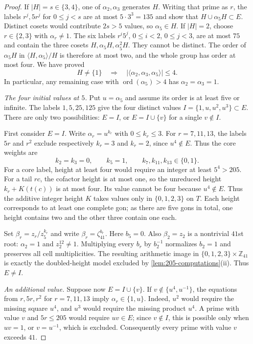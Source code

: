 \documentclass[11pt,reqno]{amsart}
\newcommand{\Z}{\mathbb Z}
\theoremstyle{definition}
\theoremstyle{remark}
\numberwithin{equation}{section}
\begin{document}
\begin{proof}
If $|H|=s\in\{3,4\}$, one of $\alpha_2,\alpha_3$ generates $H$.
Writing that prime as $r$, the labels $r^j,5r^j$ for $0\le j<s$
are at most $5\cdot3^3=135$ and show that
$H\cup\alpha_5H\subset E$. Distinct cosets would contribute
$2s>5$ values, so $\alpha_5\in H$.
If $|H|=2$, choose $r\in\{2,3\}$ with $\alpha_r\ne1$.
The six labels $r^i5^j$, $0\le i<2$, $0\le j<3$, are at most
$75$ and contain the three cosets $H,\alpha_5H,\alpha_5^2H$.
They cannot be distinct. The order of $\alpha_5H$ in
$\langle H,\alpha_5\rangle/H$ is therefore at most two, and the
whole group has order at most four. We have proved
\begin{equation}\label{eq:205-small-phase-subgroup}
 H\ne\{1\}\quad\Longrightarrow\quad
 |\langle\alpha_2,\alpha_3,\alpha_5\rangle|\le4.
\end{equation}
In particular, any remaining case with
$\operatorname{ord}(\alpha_5)>4$ has $\alpha_2=\alpha_3=1$.

\smallskip\noindent
\emph{The four initial values at $5$.}
Put $u=\alpha_5$ and assume its order is at least five or infinite.
The labels $1,5,25,125$ give the four distinct values
$I=\{1,u,u^2,u^3\}\subset E$. There are only two possibilities:
$E=I$, or $E=I\cup\{v\}$ for a single $v\notin I$.

First consider $E=I$. Write $\alpha_r=u^{k_r}$ with
$0\le k_r\le3$. For $r=7,11,13$, the labels $5r$ and $r^2$
exclude respectively $k_r=3$ and $k_r=2$, since $u^4\notin E$.
Thus the core weights are
\[
 k_2=k_3=0,\qquad k_5=1,\qquad
 k_7,k_{11},k_{13}\in\{0,1\}.
\]
For a core label, height at least four would require an integer at
least $5^4>205$. For a tail $rc$, the cofactor height is at most one,
so the unreduced height $k_r+K(t(c))$ is at most four. Its value
cannot be four because $u^4\notin E$. Thus the additive integer height
$K$ takes values only in $\{0,1,2,3\}$ on $T$. Each height corresponds
to at least one complete gon; as there are five gons in total, one height contains two
and the other three contain one each.

Set $\beta_r=z_r/z_5^{k_r}$ and write
$\beta_r=\zeta_{41}^{b_r}$. Here $b_5=0$. Also $\beta_2=z_2$ is a
nontrivial $41$st root: $\alpha_2=1$ and $z_2^{12}\ne1$.
Multiplying every $b_r$ by $b_2^{-1}$ normalizes $b_2=1$ and preserves
all cell multiplicities. The resulting arithmetic image in
$\{0,1,2,3\}\times\Z_{41}$ is exactly the doubled-height model
excluded by \cref{lem:205-computations}(ii). Thus $E\ne I$.

\smallskip\noindent
\emph{An additional value.}
Suppose now $E=I\cup\{v\}$. If
$v\notin\{u^4,u^{-1}\}$, the equations from $r,5r,r^2$ for
$r=7,11,13$ imply $\alpha_r\in\{1,u\}$.
Indeed, $u^2$ would require the missing square $u^4$, and $u^3$
would require the missing product $u^4$. A prime with value $v$ and
$5r\le205$ would require $uv\in E$; since $v\notin I$, this is
possible only when $uv=1$, or $v=u^{-1}$, which is excluded.
Consequently every prime with value $v$ exceeds $41$.


\end{proof}
\end{document}
